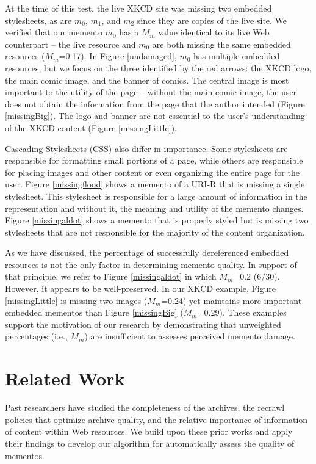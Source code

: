 At the time of this test, the live XKCD site was missing two embedded stylesheets, as are $m_0$, $m_1$, and $m_2$ since they are copies of the live site. We verified that our memento $m_0$ has a $M_m$ value identical to its live Web counterpart -- the live resource and $m_0$ are both missing the same embedded resources ($M_m$=0.17). In Figure \ref{undamaged}, $m_0$ has multiple embedded resources, but we focus on the three identified by the red arrows: the XKCD logo, the main comic image, and the banner of comics. The central image is most important to the utility of the page -- without the main comic image, the user does not obtain the information from the page that the author intended (Figure \ref{missingBig}). The logo and banner are not essential to the user's understanding of the XKCD content (Figure \ref{missingLittle}). 

Cascading Stylesheets (CSS) also differ in importance. Some stylesheets are responsible for formatting small portions of a page, while others are responsible for placing images and other content or even organizing the entire page for the user. Figure \ref{missingflood} shows a memento of a URI-R that is missing a single stylesheet. This stylesheet is responsible for a large amount of information in the representation and without it, the meaning and utility of the memento changes. Figure \ref{missingaldot} shows a memento that is properly styled but is missing two stylesheets that are not responsible for the majority of the content organization.%

As we have discussed, the percentage of successfully dereferenced embedded resources is not the only factor in determining memento quality. In support of that principle, we refer to Figure \ref{missingaldot} in which $M_m$=0.2 (6/30). However, it appears to be well-preserved. In our XKCD example, Figure \ref{missingLittle} is missing two images ($M_m$=0.24) yet maintains more important embedded mementos than Figure \ref{missingBig} ($M_m$=0.29). These examples support the motivation of our research by demonstrating that unweighted percentages (i.e., $M_m$) are insufficient to assesses perceived memento damage.


\section{Related Work}
\label{priorwork}
Past researchers have studied the completeness of the archives, the recrawl policies that optimize archive quality, and the relative importance of information of content within Web resources. We build upon these prior works and apply their findings to develop our algorithm for automatically assess the quality of mementos.

